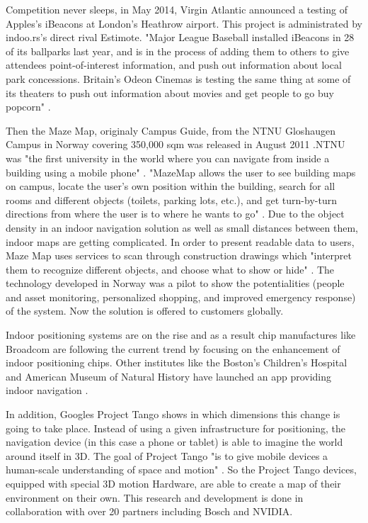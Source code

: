 Competition never sleeps, in May 2014, Virgin Atlantic announced a testing of Apples's iBeacons at London's Heathrow airport. This project is administrated by indoo.rs's direct rival Estimote. "Major League Baseball installed iBeacons in 28 of its ballparks last year, and is in the process of adding them to others to give attendees point-of-interest information, and push out information about local park concessions. Britain's Odeon Cinemas is testing the same thing at some of its theaters to push out information about movies and get people to go buy popcorn" \textcite{flySfo3}. 

Then the Maze Map, originaly Campus Guide, from the NTNU Gloshaugen Campus in Norway covering 350,000 sqm was released in August 2011 .NTNU was "the first university in the world where you can navigate from inside a building using a mobile phone"  \textcite{campusGuide1}. "MazeMap allows the user to see building maps on campus, locate the user’s own position within the building, search for all rooms and different objects (toilets, parking lots, etc.), and get turn-by-turn directions from where the user is to where he wants to go" \textcite{mazeMap1}. Due to the object density in an indoor navigation solution as well as small distances between them, indoor maps are getting complicated. In order to present readable data to users, Maze Map uses services to scan through construction drawings which "interpret them to recognize different objects, and choose what to show or hide" \textcite{mazeMap1}. The technology developed in Norway was a pilot to show the potentialities (people and asset monitoring, personalized shopping, and improved emergency response) of the system. Now the solution is offered to customers globally.
 
Indoor positioning systems are on the rise and as a result chip manufactures like Broadcom are following the current trend by focusing on the enhancement of indoor positioning chips. Other institutes like the Boston's Children's Hospital and American Museum of Natural History have launched an app providing indoor navigation \parencite{mazeMap1}.

In addition, Googles Project Tango shows in which dimensions this change is going to take place. Instead of using a given infrastructure for positioning, the navigation device (in this case a phone or tablet) is able to imagine the world around itself in 3D. The goal of Project Tango "is to give mobile devices a human-scale understanding of space and motion" \textcite{projectTango}. So the Project Tango devices, equipped with special 3D motion Hardware, are able to create a map of their environment on their own. This research and development is done in collaboration with over 20 partners including Bosch and NVIDIA. \parencite{projectTango}

